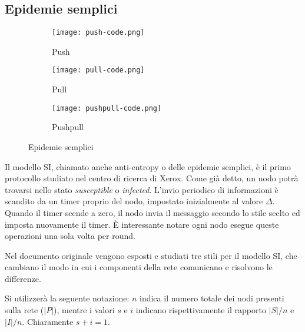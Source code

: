 \subsection{Epidemie semplici}

\begin{figure}[!htb]
    \begin{subfigure}{0.32\textwidth}
      \texttt{[image: push-code.png]}
      \caption{Push}\label{fig:push_code}
    \end{subfigure}\hfill
    \begin{subfigure}{0.32\textwidth}
      \texttt{[image: pull-code.png]}
      \caption{Pull}\label{fig:pull_code}
    \end{subfigure}\hfill
    \begin{subfigure}{0.32\textwidth}
      \texttt{[image: pushpull-code.png]}
      \caption{Pushpull}\label{fig:pushpull_code}
    \end{subfigure}
    \caption{Epidemie semplici}
    \label{fig:simple_epidemics}
    \end{figure}
Il modello SI, chiamato anche anti-entropy o delle epidemie semplici, è il primo protocollo studiato nel centro di ricerca di Xerox. Come già detto, un nodo potrà trovarsi nello stato \textit{susceptible} o \textit{infected}. L'invio periodico di informazioni è scandito da un timer proprio del nodo, impostato inizialmente al valore $\Delta$. Quando il timer scende a zero, il nodo invia il messaggio secondo lo stile scelto ed imposta nuovamente il timer. È interessante notare ogni nodo esegue queste operazioni una sola volta per round.

Nel documento originale vengono esposti e studiati tre stili per il modello SI, che cambiano il modo in cui i componenti della rete comunicano e risolvono le differenze. 

Si utilizzerà la seguente notazione: $n$ indica il numero totale dei nodi presenti sulla rete ($|P|$), mentre i valori $s$ e $i$ indicano rispettivamente il rapporto $|S|/n$ e $|I|/n$. Chiaramente $s + i = 1$.
